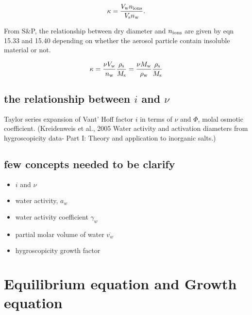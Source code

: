 \documentclass[12pt]{article}
\begin{document}
\begin{equation}\label{eqn:6}
\kappa= \frac{V_{\rm w} n_{\rm ions}}{V_{\rm s} n_{\rm w}}.
\end{equation}

From S$\&$P, the relationship between dry diameter and $n_{\rm ions}$ are given by eqn 15.33 and 15.40 depending on whether the aerosol particle contain insoluble material or not.

\begin{equation}\label{eqn:7}
\kappa= \frac{\nu V_{\rm w}}{n_{\rm w}}  \frac{\rho_{\rm s}}{M_{\rm s}}= \frac{\nu M_{\rm w}}{\rho_{\rm w}}  \frac{\rho_{\rm s}}{M_{\rm s}}
\end{equation}


\subsection{the relationship between $i$ and $\nu$}

Taylor series expansion of Vant' Hoff factor $i$ in terms of $\nu$ and $\Phi$, molal osmotic coefficient. (Kreidenweis et al., 2005 Water activity and activation diameters from hygroscopicity data- Part I: Theory and application to inorganic salts.)


\subsection{few concepts needed to be clarify}

\begin{itemize}

\item $i$ and $\nu$
\item water activity, $a_{w}$
\item water activity coefficient $\gamma_{w}$
\item partial molar volume of water $\overline{v_{w}}$
\item hygroscopicity growth factor

\end{itemize}


\section{Equilibrium equation and Growth equation}
\end{document}
